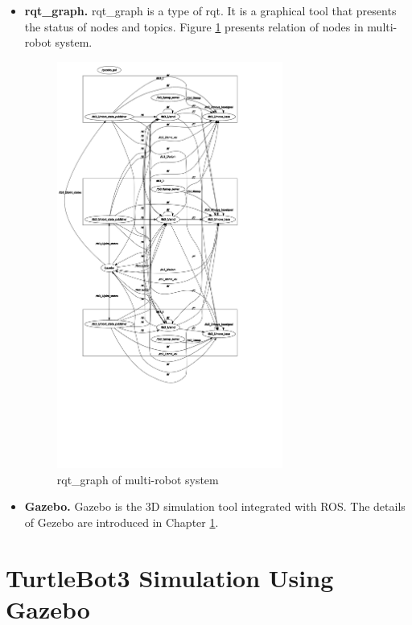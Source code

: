 \begin{itemize}
 \item \textbf{rqt\_graph.} rqt\_graph is a type of rqt. It is a graphical tool that presents the status of nodes and topics. Figure \ref{fig:rqt_graph} presents relation of nodes in multi-robot system.
 \begin{figure}[htbp]
 \centering
 \includegraphics[width = 0.7\textwidth]{content/images/ch2/rosgraph.png}
 \caption{rqt\_graph of multi-robot system}
 \label{fig:rqt_graph}
 \end{figure}

 \item \textbf{Gazebo.} Gazebo \cite{GZ} is the 3D simulation tool integrated with ROS. The details of Gezebo are introduced in Chapter \ref{sec:modeling_gazebo}.
\end{itemize}

\section{TurtleBot3 Simulation Using Gazebo}
\label{sec:modeling_gazebo}


